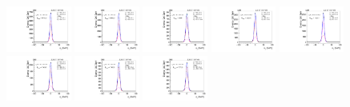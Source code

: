 \begin{figure}[htb]
\includegraphics[width=0.19\textwidth]{plots/Appendix_Recoil_Fits/WmpMC_PF_5TeV_2G/pfu2fit_8.pdf}
\includegraphics[width=0.19\textwidth]{plots/Appendix_Recoil_Fits/WmpMC_PF_5TeV_2G/pfu2fit_9.pdf}
\includegraphics[width=0.19\textwidth]{plots/Appendix_Recoil_Fits/WmpMC_PF_5TeV_2G/pfu2fit_19.pdf}
\includegraphics[width=0.19\textwidth]{plots/Appendix_Recoil_Fits/WmpMC_PF_5TeV_2G/pfu2fit_11.pdf}
\includegraphics[width=0.19\textwidth]{plots/Appendix_Recoil_Fits/WmpMC_PF_5TeV_2G/pfu2fit_12.pdf}
\includegraphics[width=0.19\textwidth]{plots/Appendix_Recoil_Fits/WmpMC_PF_5TeV_2G/pfu2fit_13.pdf}
\includegraphics[width=0.19\textwidth]{plots/Appendix_Recoil_Fits/WmpMC_PF_5TeV_2G/pfu2fit_14.pdf}
\includegraphics[width=0.19\textwidth]{plots/Appendix_Recoil_Fits/WmpMC_PF_5TeV_2G/pfu2fit_15.pdf}

\end{figure}
